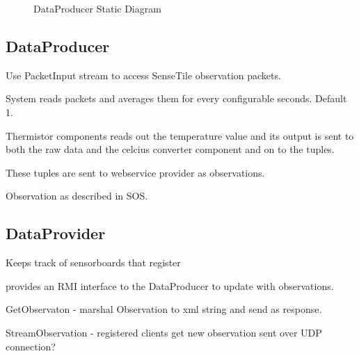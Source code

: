 \documentclass[]{final_report}
\begin{document}
 \begin{figure}
\caption{DataProducer Static Diagram}\label{fig:sensetile_static_diagam.png}
\end{figure}

\subsection{DataProducer}
Use PacketInput stream to access SenseTile observation packets.

System reads packets and averages them for every configurable seconds. Default 1.

Thermistor components reads out the temperature value
and its output is sent to both the raw data and the celcius
converter component and on to the tuples.

These tuples are sent to webservice provider as observations.

Observation as described in SOS.

\subsection {DataProvider}

Keeps track of sensorboards that register

provides an RMI interface to the DataProducer to update with observations. 


GetObservaton - marshal Observation to xml string and send as response.

StreamObservation -  registered clients get new observation sent over UDP connection?
\end{document}
